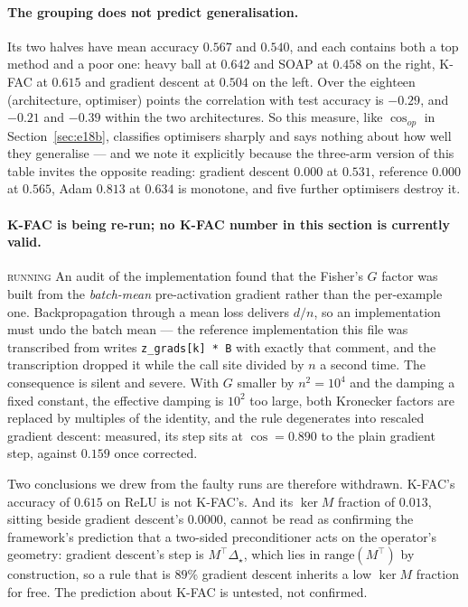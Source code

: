 \documentclass{article} %
\theoremstyle{plain}
\theoremstyle{definition}
\theoremstyle{remark}
\newcommand{\RUNNING}{{\footnotesize\textsc{running}}}
\begin{document}
\paragraph{The grouping does not predict generalisation.} Its two halves have mean accuracy $0.567$
and $0.540$, and each contains both a top method and a poor one: heavy ball at $0.642$ and SOAP at
$0.458$ on the right, K-FAC at $0.615$ and gradient descent at $0.504$ on the left. Over the
eighteen (architecture, optimiser) points the correlation with test accuracy is $-0.29$, and
$-0.21$ and $-0.39$ within the two architectures. So this measure, like $\cos_{op}$ in
Section~\ref{sec:e18b}, classifies optimisers sharply and says nothing about how well they
generalise --- and we note it explicitly because the three-arm version of this table invites the
opposite reading: gradient descent $0.000$ at $0.531$, reference $0.000$ at $0.565$, Adam $0.813$
at $0.634$ is monotone, and five further optimisers destroy it.

\paragraph{K-FAC is being re-run; no K-FAC number in this section is currently valid.}
\RUNNING{} An audit of the implementation found that the Fisher's $G$ factor was built from the
\emph{batch-mean} pre-activation gradient rather than the per-example one. Backpropagation through
a mean loss delivers $d/n$, so an implementation must undo the batch mean --- the reference
implementation this file was transcribed from writes \texttt{z\_grads[k] * B} with exactly that
comment, and the transcription dropped it while the call site divided by $n$ a second time. The
consequence is silent and severe. With $G$ smaller by $n^2 = 10^4$ and the damping a fixed
constant, the effective damping is $10^2$ too large, both Kronecker factors are replaced by
multiples of the identity, and the rule degenerates into rescaled gradient descent: measured, its
step sits at $\cos = 0.890$ to the plain gradient step, against $0.159$ once corrected.

Two conclusions we drew from the faulty runs are therefore withdrawn. K-FAC's accuracy of $0.615$
on ReLU is not K-FAC's. And its $\ker M$ fraction of $0.013$, sitting beside gradient descent's
$0.0000$, cannot be read as confirming the framework's prediction that a two-sided preconditioner
acts on the operator's geometry: gradient descent's step is $M^\top\Delta_\star$, which lies in
$\mathrm{range}(M^\top)$ by construction, so a rule that is $89\%$ gradient descent inherits a low
$\ker M$ fraction for free. The prediction about K-FAC is untested, not confirmed.
\end{document}
